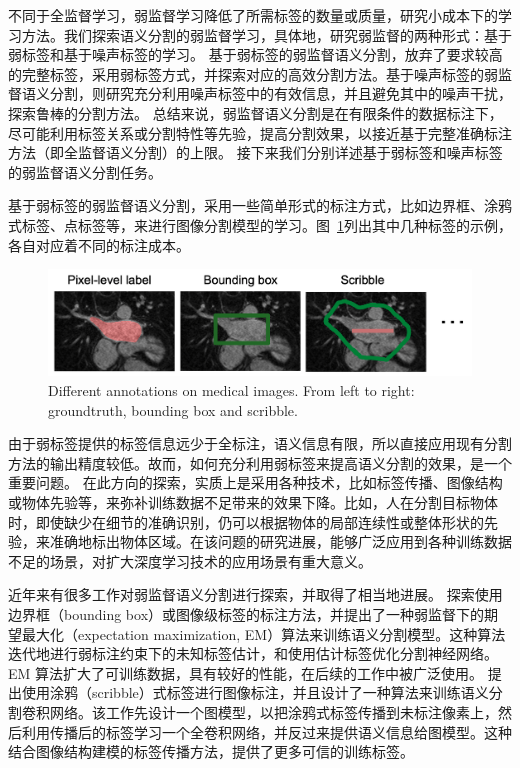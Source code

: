不同于全监督学习，弱监督学习降低了所需标签的数量或质量，研究小成本下的学习方法。我们探索语义分割的弱监督学习，具体地，研究弱监督的两种形式：基于弱标签和基于噪声标签的学习。
基于弱标签的弱监督语义分割\citep{papandreou2015weakly,rajchl2016deepcut,cai2018accurate,ji2019scribble,kervadec2020bounding}，放弃了要求较高的完整标签，采用弱标签方式，并探索对应的高效分割方法。基于噪声标签的弱监督语义分割\citep{Zhu2019PickandLearnAQ,Xue2020CascadedRL,Zhang2020RobustMI}，则研究充分利用噪声标签中的有效信息，并且避免其中的噪声干扰，探索鲁棒的分割方法。
总结来说，弱监督语义分割是在有限条件的数据标注下，尽可能利用标签关系或分割特性等先验，提高分割效果，以接近基于完整准确标注方法（即全监督语义分割）的上限。
接下来我们分别详述基于弱标签和噪声标签的弱监督语义分割任务。

基于弱标签的弱监督语义分割，采用一些简单形式的标注方式，比如边界框、涂鸦式标签、点标签等，来进行图像分割模型的学习。图~\ref{c1_fig2}列出其中几种标签的示例，各自对应着不同的标注成本。
    \begin{figure}[tbp]
        \centering 
        \includegraphics[width=1.0\textwidth]{img/c1/intro_2.png}
        {Different annotations on medical images. From left to right: groundtruth, bounding box and scribble.}
        \label{c1_fig2}
    \end{figure}
由于弱标签提供的标签信息远少于全标注，语义信息有限，所以直接应用现有分割方法的输出精度较低。故而，如何充分利用弱标签来提高语义分割的效果，是一个重要问题。
在此方向的探索，实质上是采用各种技术，比如标签传播、图像结构或物体先验等，来弥补训练数据不足带来的效果下降。比如，人在分割目标物体时，即使缺少在细节的准确识别，仍可以根据物体的局部连续性或整体形状的先验，来准确地标出物体区域。在该问题的研究进展，能够广泛应用到各种训练数据不足的场景，对扩大深度学习技术的应用场景有重大意义。

近年来有很多工作对弱监督语义分割进行探索，并取得了相当地进展。
\citet{papandreou2015weakly} 探索使用边界框（bounding box）或图像级标签的标注方法，并提出了一种弱监督下的期望最大化（expectation maximization, EM）算法来训练语义分割模型。这种算法迭代地进行弱标注约束下的未知标签估计，和使用估计标签优化分割神经网络。EM 算法扩大了可训练数据，具有较好的性能，在后续的工作中被广泛使用。
\citet{lin2016scribblesup} 提出使用涂鸦（scribble）式标签进行图像标注，并且设计了一种算法来训练语义分割卷积网络。该工作先设计一个图模型，以把涂鸦式标签传播到未标注像素上，然后利用传播后的标签学习一个全卷积网络，并反过来提供语义信息给图模型。这种结合图像结构建模的标签传播方法，提供了更多可信的训练标签。


